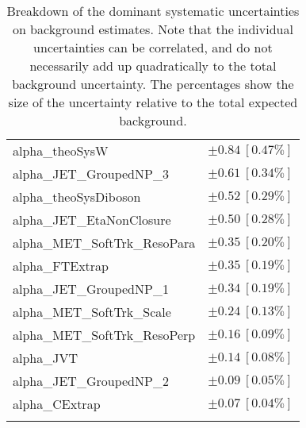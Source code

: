 \begin{table}
\begin{center}
\begin{tabular*}{\textwidth}{@{\extracolsep{\fill}}lc}
alpha\_theoSysW         & $\pm 0.84\ [0.47\%] $       \\
alpha\_JET\_GroupedNP\_3         & $\pm 0.61\ [0.34\%] $       \\
alpha\_theoSysDiboson         & $\pm 0.52\ [0.29\%] $       \\
alpha\_JET\_EtaNonClosure         & $\pm 0.50\ [0.28\%] $       \\
alpha\_MET\_SoftTrk\_ResoPara         & $\pm 0.35\ [0.20\%] $       \\
alpha\_FTExtrap         & $\pm 0.35\ [0.19\%] $       \\
alpha\_JET\_GroupedNP\_1         & $\pm 0.34\ [0.19\%] $       \\
alpha\_MET\_SoftTrk\_Scale         & $\pm 0.24\ [0.13\%] $       \\
alpha\_MET\_SoftTrk\_ResoPerp         & $\pm 0.16\ [0.09\%] $       \\
alpha\_JVT         & $\pm 0.14\ [0.08\%] $       \\
alpha\_JET\_GroupedNP\_2         & $\pm 0.09\ [0.05\%] $       \\
alpha\_CExtrap         & $\pm 0.07\ [0.04\%] $       \\
\noalign{\smallskip}\hline\noalign{\smallskip}
\end{tabular*}
\end{center}
\caption[Breakdown of uncertainty on background estimates]{
Breakdown of the dominant systematic uncertainties on background estimates.
Note that the individual uncertainties can be correlated, and do not necessarily add up quadratically to 
the total background uncertainty. The percentages show the size of the uncertainty relative to the total expected background.
\label{table.results.bkgestimate.uncertainties.SRB_T0}}
\end{table}
%